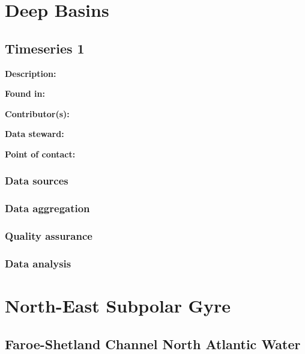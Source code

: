 \documentclass[
]{book}
\begin{document}
\hypertarget{deep-basins}{%
\chapter{Deep Basins}\label{deep-basins}}

\hypertarget{timeseries-1-3}{%
\section{Timeseries 1}\label{timeseries-1-3}}

\textbf{Description:}

\textbf{Found in:}

\textbf{Contributor(s):}

\textbf{Data steward:}

\textbf{Point of contact:}

\hypertarget{data-sources-3}{%
\subsection{Data sources}\label{data-sources-3}}

\hypertarget{data-aggregation-3}{%
\subsection{Data aggregation}\label{data-aggregation-3}}

\hypertarget{quality-assurance-3}{%
\subsection{Quality assurance}\label{quality-assurance-3}}

\hypertarget{data-analysis-3}{%
\subsection{Data analysis}\label{data-analysis-3}}

\hypertarget{north-east-subpolar-gyre}{%
\chapter{North-East Subpolar Gyre}\label{north-east-subpolar-gyre}}

\hypertarget{faroe-shetland-channel-north-atlantic-water}{%
\section{Faroe-Shetland Channel North Atlantic Water}\label{faroe-shetland-channel-north-atlantic-water}}
\end{document}
